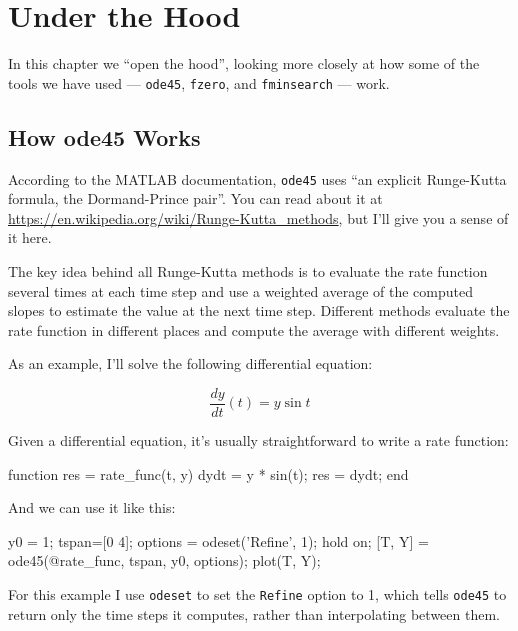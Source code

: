 \chapter{Under the Hood}
\label{how}

In this chapter we ``open the hood'', looking more closely at how some of the tools we have used --- {\tt ode45}, {\tt fzero}, and {\tt fminsearch} --- work.


\section{How ode45 Works}
\label{howode45}

According to the MATLAB documentation, {\tt ode45} uses ``an explicit Runge-Kutta formula, the Dormand-Prince pair''.  You can read about it at \url{https://en.wikipedia.org/wiki/Runge-Kutta_methods}, but I'll give you a sense of it here.


The key idea behind all Runge-Kutta methods is to evaluate the rate function several times at each time step and use a weighted average of the computed slopes to estimate the value at the next time step.  
Different methods evaluate the rate function in different places and compute the average with different weights.


As an example, I'll solve the following differential equation:

\[ \frac{dy}{dt}(t) = y \sin t \] 

Given a differential equation, it's usually straightforward to write a rate function:

\begin{code}
function res = rate_func(t, y)
    dydt = y * sin(t);
    res = dydt;
end
\end{code}

And we can use it like this:

\begin{code}
    y0 = 1;
    tspan=[0 4];
    options = odeset('Refine', 1);
    hold on;
    [T, Y] = ode45(@rate_func, tspan, y0, options);
    plot(T, Y);
\end{code}

For this example I use {\tt odeset} to set the {\tt Refine} option to 1, which tells {\tt ode45} to return only the time steps it computes, rather than interpolating between them.

